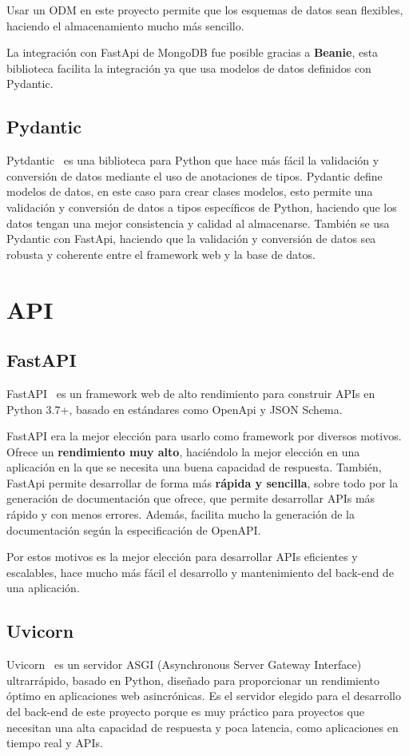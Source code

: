 Usar un ODM en este proyecto permite que los esquemas de datos sean flexibles, haciendo el almacenamiento mucho más sencillo.

La integración con FastApi de MongoDB fue posible gracias a \textbf{Beanie}, esta biblioteca facilita la integración ya que usa modelos de datos definidos con Pydantic. 

\subsection{Pydantic}
Pytdantic~\cite{pydantic} es una biblioteca para Python que hace más fácil la validación y conversión de datos mediante el uso de anotaciones de tipos.
Pydantic define modelos de datos, en este caso para crear clases modelos, esto permite una validación y conversión de datos a tipos específicos de Python, haciendo que los datos tengan una mejor consistencia y calidad al almacenarse. También se usa Pydantic con FastApi, haciendo que la validación y conversión de datos sea robusta y coherente entre el framework web y la base de datos.

\section{API}

\subsection{FastAPI}
FastAPI~\cite{fastapi} es un framework web de alto rendimiento para construir APIs en Python 3.7+, basado en estándares como OpenApi y JSON Schema. 

FastAPI era la mejor elección para usarlo como framework por diversos motivos. Ofrece un \textbf{rendimiento muy alto}, haciéndolo la mejor elección en una aplicación en la que se necesita una buena capacidad de respuesta.
También, FastApi permite desarrollar de forma más \textbf{rápida y sencilla}, sobre todo por la generación de documentación que ofrece, que permite desarrollar APIs más rápido y con menos errores.
Además, facilita mucho la generación de la documentación según la especificación de OpenAPI.

Por estos motivos es la mejor elección para desarrollar APIs eficientes y escalables, hace mucho más fácil el desarrollo y mantenimiento del back-end de una aplicación.

\subsection{Uvicorn}
Uvicorn~\cite{uvicorn2024} es un servidor ASGI (Asynchronous Server Gateway Interface) ultrarrápido, basado en Python, diseñado para proporcionar un rendimiento óptimo en aplicaciones web asincrónicas. Es el servidor elegido para el desarrollo del back-end de este proyecto porque es muy práctico para proyectos que necesitan una alta capacidad de respuesta y poca latencia, como aplicaciones en tiempo real y APIs.

